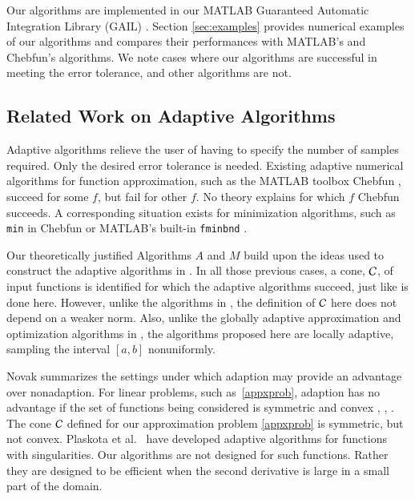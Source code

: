 \documentclass[review]{elsarticle}
\theoremstyle{definition}
\begin{document}
Our algorithms are implemented in our MATLAB Guaranteed Automatic
Integration Library (GAIL) \cite{ChoEtal15a}. Section \ref{sec:examples}
provides numerical examples of our algorithms and compares their
performances with MATLAB's and Chebfun's algorithms. We note cases where our
algorithms are successful in meeting the error tolerance, and other
algorithms are not.

\subsection{Related Work on Adaptive Algorithms}

Adaptive algorithms relieve the user of having to specify the number of samples
required. Only the desired error tolerance is needed. Existing adaptive
numerical algorithms for function approximation, such as the MATLAB toolbox
Chebfun \citep{TrefEtal16a}, succeed for some $f$, but fail for other $f$. No
theory explains for which $f$ Chebfun succeeds. A corresponding situation exists
for minimization algorithms, such as \texttt{min} in Chebfun or MATLAB's
built-in \texttt{fminbnd} \citep{MAT9.1}.

Our theoretically justified Algorithms $A$ and $M$ build upon the ideas used to
construct the adaptive algorithms in \cite{HicEtal14b, Din15a, HicEtal14a,
HicJim16a, Jia16a, JimHic16a,Ton14a}. In all those previous cases, a
cone, $\mathcal{C}$, of input functions is identified for which the adaptive algorithms
succeed, just like is done here. However, unlike the algorithms in \cite{HicEtal14b, Din15a,
HicEtal14a,Ton14a}, the definition of $\mathcal{C}$ here does not
depend on a weaker norm. Also, unlike
the globally adaptive approximation and optimization algorithms in
\cite{HicEtal14b,Ton14a}, the algorithms proposed here are locally adaptive,
sampling the interval $[a, b]$ nonuniformly.

Novak \cite{Nov96a} summarizes the settings under which adaption may provide an
advantage over nonadaption. For linear problems, such as~\eqref{appxprob},
adaption has no advantage if the set of functions being considered is symmetric
and convex \cite[Theorem 1]{Nov96a}, \cite[Chapter 4, Theorem
5.2.1]{TraWasWoz88}, \cite{Woz88a}.
The cone $\mathcal{C}$ defined for our approximation
problem
\eqref{appxprob} is symmetric, but not convex. Plaskota et al.~\cite{PlaEtal08a}
have developed adaptive algorithms for functions with singularities. Our
algorithms are not designed for such functions. Rather they are
designed to be efficient when the second derivative is large in a small part of
the domain.
\end{document}
